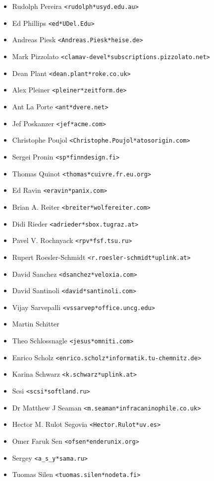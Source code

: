 \documentclass[a4paper,titlepage,12pt]{article}
\newcommand{\email}[1]{\texttt{#1}}
\begin{document}
\begin{itemize}
	\item Rudolph Pereira \email{<rudolph*usyd.edu.au>}
	\item Ed Phillips \email{<ed*UDel.Edu>}
	\item Andreas Piesk \email{<Andreas.Piesk*heise.de>}
	\item Mark Pizzolato \email{<clamav-devel*subscriptions.pizzolato.net>}
	\item Dean Plant \email{<dean.plant*roke.co.uk>}
	\item Alex Pleiner \email{<pleiner*zeitform.de>}
	\item Ant La Porte \email{<ant*dvere.net>}
	\item Jef Poskanzer \email{<jef*acme.com>}
	\item Christophe Poujol \email{<Christophe.Poujol*atosorigin.com>}
	\item Sergei Pronin \email{<sp*finndesign.fi>}
	\item Thomas Quinot \email{<thomas*cuivre.fr.eu.org>}
	\item Ed Ravin \email{<eravin*panix.com>}
	\item Brian A. Reiter \email{<breiter*wolfereiter.com>}
	\item Didi Rieder \email{<adrieder*sbox.tugraz.at>}
	\item Pavel V. Rochnyack \email{<rpv*fsf.tsu.ru>}
	\item Rupert Roesler-Schmidt \email{<r.roesler-schmidt*uplink.at>}
	\item David Sanchez \email{<dsanchez*veloxia.com>}
	\item David Santinoli \email{<david*santinoli.com>}
	\item Vijay Sarvepalli \email{<vssarvep*office.uncg.edu>}
	\item Martin Schitter
	\item Theo Schlossnagle \email{<jesus*omniti.com>}
	\item Enrico Scholz \email{<enrico.scholz*informatik.tu-chemnitz.de>}
	\item Karina Schwarz \email{<k.schwarz*uplink.at>}
	\item Scsi \email{<scsi*softland.ru>}
	\item Dr Matthew J Seaman \email{<m.seaman*infracaninophile.co.uk>}
	\item Hector M. Rulot Segovia \email{<Hector.Rulot*uv.es>}
	\item Omer Faruk Sen \email{<ofsen*enderunix.org>}
	\item Sergey \email{<a\_s\_y*sama.ru>}
	\item Tuomas Silen \email{<tuomas.silen*nodeta.fi>}

\end{itemize}
\end{document}
